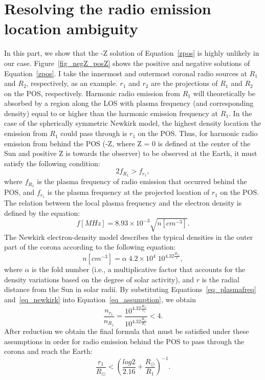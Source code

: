 \section{Resolving the radio emission location ambiguity}
\label{ch3_append_b}
In this part, we show that the -Z solution of Equation~\ref{zpos} is highly unlikely in our case. Figure~\ref{fig_negZ_posZ} shows the positive and negative solutions of Equation~\ref{zpos}. I take the innermost and outermost coronal radio sources at $R_1$ and $R_2$, respectively, as an example. $r_1$ and $r_2$ are the projections of $R_1$ and $R_2$ on the POS, respectively. Harmonic radio emission from $R_1$ will theoretically be absorbed by a region along the LOS with plasma frequency (and corresponding density) equal to or higher than the harmonic emission frequency at $R_1$. In the case of the spherically symmetric Newkirk model, the highest density location the emission from $R_1$ could pass through is $r_1$ on the POS. Thus, for harmonic radio emission from behind the POS (-Z, where Z = 0 is defined at the center of the Sun and positive Z is towards the observer) to be observed at the Earth, it must satisfy the following condition:
\begin{equation}
	2f_{R_1} > f_{r_1}
	\label{eq_assumption}
	,\end{equation}
where $f_{R_1}$ is the plasma frequency of radio emission that occurred behind the POS, and $f_{r_1}$ is the plasma frequency at the projected location of $r_1$ on the POS.
The relation between the local plasma frequency and the electron density is defined by the equation:
\begin{equation}
	f[MHz] = 8.93 \times 10^{-3} \sqrt{n[cm^{-3}]}
	\label{eq_plasmafreq}
	.\end{equation}
The Newkirk electron-density model \citep{newkirk_1961, newkirk_1967} describes the typical densities in the outer part of the corona according to the following equation:
\begin{equation}
	n[cm^{-3}] = \alpha \; 4.2 \times 10^4 \; 10^{4.32 \frac{R_\odot}{r}}
	\label{eq_newkirk}
	,\end{equation}
where $\alpha$ is the fold number (i.e., a multiplicative factor that accounts for the density variations based on the degree of solar activity), and $r$ is the radial distance from the Sun in solar radii.
By substituting Equations~\ref{eq_plasmafreq} and~\ref{eq_newkirk} into Equation~\ref{eq_assumption}, we obtain
\begin{equation}
	\frac{n_{r_1}}{n_{R_1}} = \frac{10^{4.32 \frac{R_\odot}{r_1}}}{10^{4.32 \frac{R_\odot}{R_1}}} < 4.
	\label{eq_condition}
\end{equation}
After reduction we obtain the final formula that must be satisfied under these assumptions in order for radio emission behind the POS to pass through the corona and reach the Earth:
\begin{equation}
	\frac{r_1}{R_\odot} < \left( \frac{log 2}{2.16} + \frac{R_\odot}{R_1} \right)^{-1}.
\end{equation}

